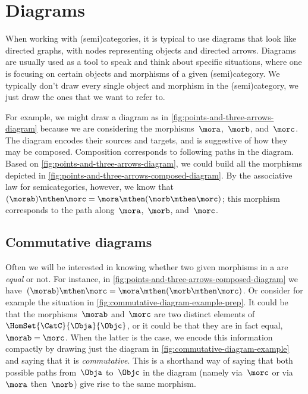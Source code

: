 
\section{Diagrams}

When working with (semi)categories, it is typical to use diagrams that look like directed graphs, with nodes representing objects and directed arrows.
Diagrams are usually used as a tool to speak and think about specific situations, where one is focusing on certain objects and morphisms of a given (semi)category.
We typically don't draw every single object and morphism in the (semi)category, we just draw the ones that we want to refer to.

\begin{marginfigure}
    \centering
    \caption{}
    \label{fig:points-and-three-arrows-diagram}
\end{marginfigure}

\begin{marginfigure}
    \centering
    \caption{}
    \label{fig:points-and-three-arrows-composed-diagram}
\end{marginfigure}

For example, we might draw a diagram as in \cref{fig:points-and-three-arrows-diagram} because we are considering the morphisms~$\mora$,~$\morb$, and~$\morc$.
The diagram encodes their sources and targets, and is suggestive of how they may be composed.
Composition corresponds to following paths in the diagram.
Based on \cref{fig:points-and-three-arrows-diagram}, we could build all the morphisms depicted in \cref{fig:points-and-three-arrows-composed-diagram}.
By the associative law for semicategories, however, we know that~$(\morab) \mthen \morc = \mora \mthen (\morb \mthen \morc)$;
this morphism corresponds to the path along~$\mora$,~$\morb$, and~$\morc$.

\subsection{Commutative diagrams}

Often we will be interested in knowing whether two given morphisms in a  are \emph{equal} or not.
For instance, in \cref{fig:points-and-three-arrows-composed-diagram} we have~$(\morab) \mthen \morc = \mora \mthen (\morb \mthen \morc)$.
Or consider for example the situation in \cref{fig:commutative-diagram-example-prep}.
It could be that the morphisms~$\morab$ and~$\morc$ are two distinct elements of~$\HomSet{\CatC}{\Obja}{\Objc}$, or it could be that they are in fact equal,~$\morab = \morc$.
When the latter is the case, we encode this information compactly by drawing just the diagram in \cref{fig:commutative-diagram-example} and saying that it is \emph{commutative}.
This is a shorthand way of saying that both possible paths from~$\Obja$ to~$\Objc$ in the diagram (namely via~$\morc$ or via~$\mora$ then~$\morb$) give rise to the same morphism.

